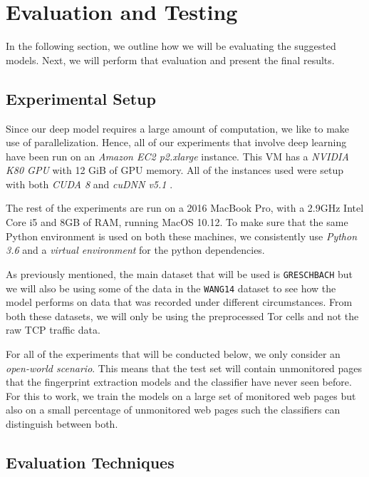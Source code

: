 

\chapter{Evaluation and Testing}

In the following section, we outline how we will be evaluating the suggested models.
Next, we will perform that evaluation and present the final results.

\section{Experimental Setup}

Since our deep model requires a large amount of computation, we like to make use of parallelization.
Hence, all of our experiments that involve deep learning have been run on an \textit{Amazon EC2 p2.xlarge} instance.
This VM has a \textit{NVIDIA K80 GPU} with 12 GiB of GPU memory.
All of the instances used were setup with both \textit{CUDA 8} and \textit{cuDNN v5.1} \cite{tensorflow,nvidia_developer_2017}.

The rest of the experiments are run on a 2016 MacBook Pro, with a 2.9GHz Intel Core i5 and 8GB of RAM, running MacOS 10.12.
To make sure that the same Python environment is used on both these machines, we consistently use \textit{Python 3.6} and a \textit{virtual environment} for the python dependencies.

As previously mentioned, the main dataset that will be used is \texttt{GRESCHBACH} but we will also be using some of the data in the \texttt{WANG14} dataset to see how the model performs on data that was recorded under different circumstances.
From both these datasets, we will only be using the preprocessed Tor cells and not the raw TCP traffic data.

For all of the experiments that will be conducted below, we only consider an \textit{open-world scenario}.
This means that the test set will contain unmonitored pages that the fingerprint extraction models and the classifier have never seen before.
For this to work, we train the models on a large set of monitored web pages but also on a small percentage of unmonitored web pages such the classifiers can distinguish between both.

\section{Evaluation Techniques}

